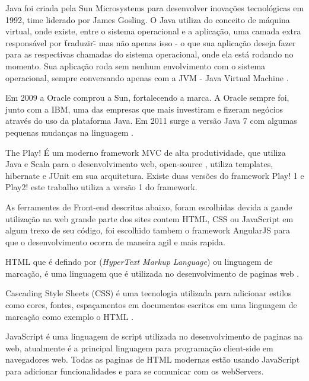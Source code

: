 \documentclass{abntpuc}
\begin{document}
Java foi criada pela Sun Microsystems para desenvolver inovações tecnológicas em 1992, time liderado por James Gosling. O Java utiliza do conceito de máquina virtual, onde existe, entre o sistema operacional e a aplicação, uma camada extra responsável por \"traduzir\" - mas não apenas isso - o que sua aplicação deseja fazer para as respectivas chamadas do sistema operacional, onde ela está rodando no momento. Sua aplicação roda sem nenhum envolvimento com o sistema operacional, sempre conversando apenas com a JVM - Java Virtual Machine \cite{caelum}.\par

Em 2009 a Oracle comprou a Sun, fortalecendo a marca. A Oracle sempre foi, junto com a IBM, uma das empresas que mais investiram e fizeram negócios através do uso da plataforma Java. Em 2011 surge a versão Java 7 com algumas pequenas mudanças na linguagem \cite{caelum}.\par


The Play! É um moderno framework MVC de alta produtividade, que utiliza Java e Scala para o desenvolvimento web, open-source , utiliza templates, hibernate e JUnit  em sua arquitetura. Existe duas versões do framework Play! 1 e Play2! este trabalho utiliza a versão 1 do framework\cite{playframework}.\par



As ferramentes de Front-end descritas abaixo, foram escolhidas devida a gande utilização na web grande parte dos sites contem HTML, CSS ou JavaScript em algum trexo de seu código, foi escolhido tambem o framework AngularJS para que o desenvolvimento ocorra de maneira agil e mais rapida.\par

HTML que é defindo por (\textit{HyperText Markup Language}) ou linguagem de marcação, é uma linguagem que é utilizada no desenvolvimento de paginas web \cite{html}.\par

Cascading Style Sheets (CSS) é uma tecnologia utilizada para adicionar estilos como cores, fontes, espaçamentos em documentos escritos em uma linguagem de marcação como exemplo o HTML \cite{css}.\par


JavaScript é uma linguagem de script utilizada no desenvolvimento de paginas na web, atualmente é a principal linguagem para programação client-side em navegadores web. Todas as paginas de HTML modernas estão usando JavaScript para adicionar funcionalidades e para se comunicar com os webServers\cite{javascript}.\par
\end{document}
